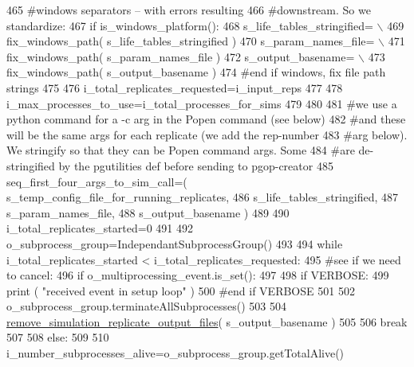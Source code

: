 \begin{DoxyCode}
465         \textcolor{comment}{#windows separators -- with errors resulting}
466         \textcolor{comment}{#downstream.  So we standardize:}
467         \textcolor{keywordflow}{if} is\_windows\_platform():
468             s\_life\_tables\_stringified= \(\backslash\)
469                 fix\_windows\_path( s\_life\_tables\_stringified )
470             s\_param\_names\_file= \(\backslash\)
471                 fix\_windows\_path( s\_param\_names\_file )              
472             s\_output\_basename= \(\backslash\)
473                 fix\_windows\_path( s\_output\_basename )   
474         \textcolor{comment}{#end if windows, fix file path strings}
475 
476         i\_total\_replicates\_requested=i\_input\_reps
477 
478         i\_max\_processes\_to\_use=i\_total\_processes\_for\_sims
479 
480 
481         \textcolor{comment}{#we use a python command for a -c arg in the Popen command (see below)}
482         \textcolor{comment}{#and these will be the same args for each replicate (we add the rep-number}
483         \textcolor{comment}{#arg below).  We stringify so that they can be Popen command args.  Some}
484         \textcolor{comment}{#are de-stringified by the pgutilities def before sending to pgop-creator}
485         seq\_first\_four\_args\_to\_sim\_call=( s\_temp\_config\_file\_for\_running\_replicates,
486                                         s\_life\_tables\_stringified,
487                                         s\_param\_names\_file,
488                                         s\_output\_basename )
489         
490         i\_total\_replicates\_started=0
491 
492         o\_subprocess\_group=IndependantSubprocessGroup()
493 
494         \textcolor{keywordflow}{while} i\_total\_replicates\_started < i\_total\_replicates\_requested:
495             \textcolor{comment}{#see if we need to cancel:  }
496             \textcolor{keywordflow}{if} o\_multiprocessing\_event.is\_set():
497 
498                 \textcolor{keywordflow}{if} VERBOSE:
499                     \textcolor{keywordflow}{print} ( \textcolor{stringliteral}{"received event in setup loop"} )
500                 \textcolor{comment}{#end if VERBOSE}
501 
502                 o\_subprocess\_group.terminateAllSubprocesses()
503                 
504                 \hyperlink{namespacenegui_1_1pgutilities_aa37c7d125e4eaec2eeea639f53fa140d}{remove\_simulation\_replicate\_output\_files}( 
      s\_output\_basename )
505 
506                 \textcolor{keywordflow}{break}
507 
508             \textcolor{keywordflow}{else}:
509 
510                 i\_number\_subprocesses\_alive=o\_subprocess\_group.getTotalAlive()

\end{DoxyCode}
